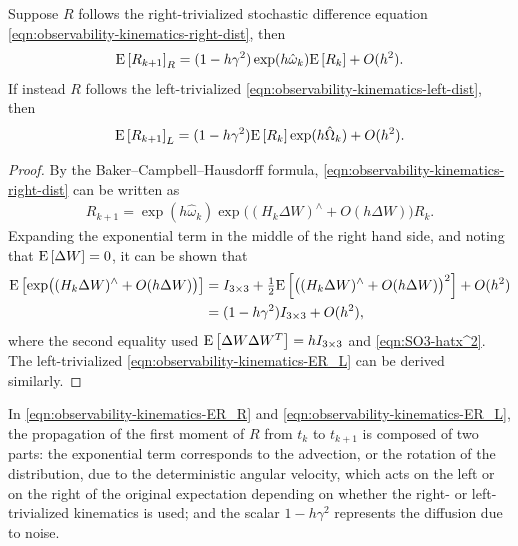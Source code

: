 \begin{theorem}
	Suppose $R$ follows the right-trivialized stochastic difference equation \eqref{eqn:observability-kinematics-right-dist}, then
	\begin{align} \label{eqn:observability-kinematics-ER_R}
		\mathrm{E}\left[ R_{k+1} \right]_R = (1-h\gamma^2) \exp(h\hat{\omega}_k) \mathrm{E}\left[ R_k \right] + O(h^2).
	\end{align}
	If instead $R$ follows the left-trivialized \eqref{eqn:observability-kinematics-left-dist}, then
	\begin{align} \label{eqn:observability-kinematics-ER_L}
		\mathrm{E}\left[ R_{k+1} \right]_L = (1-h\gamma^2) \mathrm{E}\left[ R_k \right] \exp(h\hat{\Omega}_k) + O(h^2).
	\end{align}
\end{theorem}
\begin{proof}
	By the Baker–Campbell–Hausdorff formula, \eqref{eqn:observability-kinematics-right-dist} can be written as
	\begin{align*}
		R_{k+1} = \exp(h\hat{\omega}_k) \exp\!\big( (H_k\Delta W)^\wedge + O(h\Delta W) \big) R_k.
	\end{align*}
	Expanding the exponential term in the middle of the right hand side, and noting that $\mathrm{E}\left[ \Delta W \right] = 0$, it can be shown that
	\begin{align*}
		\mathrm{E}\left[ \exp\!\big( (H_k\Delta W)^\wedge + O(h\Delta W) \big) \right] 
		&= I_{3\times 3} + \tfrac{1}{2} \mathrm{E}\left[ \big((H_k\Delta W)^\wedge + O(h\Delta W)\big)^2 \right] + O(h^2) \\
		&= (1-h\gamma^2)I_{3\times 3} + O(h^2),
	\end{align*}
	where the second equality used $\mathrm{E}\left[ \Delta W\Delta W^T \right] = hI_{3\times 3}$ and \eqref{eqn:SO3-hatx^2}.
	The left-trivialized \eqref{eqn:observability-kinematics-ER_L} can be derived similarly.
\end{proof}

In \eqref{eqn:observability-kinematics-ER_R} and \eqref{eqn:observability-kinematics-ER_L}, the propagation of the first moment of $R$ from $t_k$ to $t_{k+1}$ is composed of two parts: the exponential term corresponds to the advection, or the rotation of the distribution, due to the deterministic angular velocity, which acts on the left or on the right of the original expectation depending on whether the right- or left- trivialized kinematics is used; and the scalar $1-h\gamma^2$ represents the diffusion due to noise.

